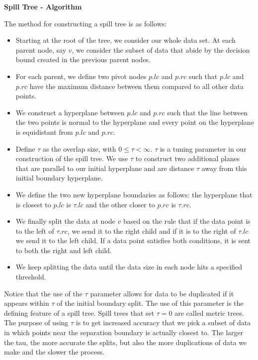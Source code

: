 \vspace{5 mm}
\noindent
\textbf{Spill Tree - Algorithm}

\vspace{5 mm}
\noindent
The method for constructing a spill tree is as follows:

\begin{itemize}
  \item Starting at the root of the tree, we consider our whole data set. At 
  each parent node, say $v$, we consider the subset of data that abide by the 
  decision bound created in the previous parent nodes.
  \item For each parent, we define two pivot nodes $p.lc$ and $p.rc$ such that 
  $p.lc$ and $p.rc$ have the maximum distance between them compared to all 
  other data points.
  \item We construct a hyperplane between $p.lc$ and $p.rc$ such that the line 
  between the two points is normal to the hyperplane and every point on the 
  hyperplane is equidistant from $p.lc$ and $p.rc$.
  \item Define $\tau$ as the overlap size, with $0 \le \tau < \infty$. $\tau$ 
  is a tuning parameter in our construction of the spill tree. We use $\tau$ 
  to construct two additional planes that are parallel to our initial 
  hyperplane and are distance $\tau$ away from this initial boundary hyperplane.
  \item We define the two new hyperplane boundaries as follows: the hyperplane 
  that is closest to $p.lc$ is $\tau.lc$ and the other closer to $p.rc$ is 
  $\tau.rc$.
  \item We finally split the data at node $v$ based on the rule that if the 
  data point is to the left of $\tau.rc$, we send it to the right child and if 
  it is to the right of $\tau.lc$ we send it to the left child. If a data point 
  satisfies both conditions, it is sent to both the right and left child.
  \item We keep splitting the data until the data size in each node hits a 
  specified threshold.
\end{itemize}

\vspace{1 mm}
\noindent
Notice that the use of the $\tau$ parameter allows for data to be duplicated if 
it appears within $\tau$ of the initial boundary split. The use of this 
parameter is the defining feature of a spill tree. Spill trees that set 
$\tau = 0$ are called metric trees. The purpose of using $\tau$ is to get 
increased accuracy that we pick a subset of data in which points near the 
separation boundary is actually closest to. The larger the tau, the more 
accurate the splits, but also the more duplications of data we make and the 
slower the process.

